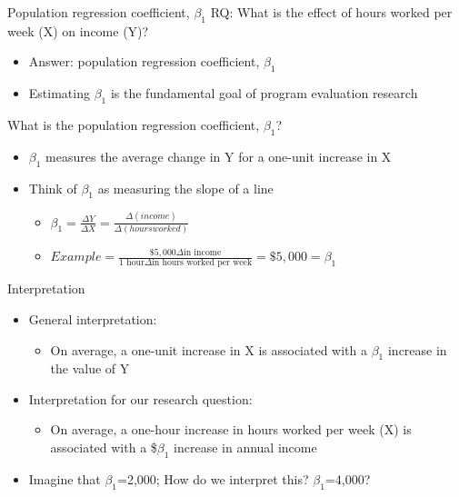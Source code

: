 \begin{frame}{Population regression coefficient, $\beta_{1}$}
	\footnotesize %
	RQ: What is the effect of hours worked per week (X) on income (Y)?
		\begin{itemize}
		\item Answer: population regression coefficient, $\beta_{1}$
		\item Estimating $\beta_{1}$ is the fundamental goal of program evaluation research
		\end{itemize}
	What is the population regression coefficient, $\beta_{1}$?
		\begin{itemize}
		\item $\beta_{1}$ measures the average change in Y for a one-unit increase in X
		\item Think of $\beta_{1}$ as measuring the slope of a line
			\begin{itemize}
			\item $\beta_{1} = \frac{\Delta Y}{\Delta X} = \frac{\Delta (income)}{\Delta (hours worked)}$
			\item $Example = \frac{\$5,000 \Delta \text{in income}}{\text{1 hour} \Delta \text{in hours worked per week}} = \$5,000 = \beta_{1} $
			\end{itemize}
		\end{itemize}
	Interpretation
		\begin{itemize}
		\item General interpretation:
			\begin{itemize}
			\item On average, a one-unit increase in X is associated with a $\beta_{1}$ increase in the value of Y
			\end{itemize}
		\item Interpretation for our research question:
			\begin{itemize}
			\item On average, a one-hour increase in hours worked per week (X) is associated with a \$$\beta_{1}$ increase in annual income
			\end{itemize}
		\item Imagine that $\beta_{1}$=2,000; How do we interpret this? $\beta_{1}$=4,000?
		\end{itemize}
\end{frame}

